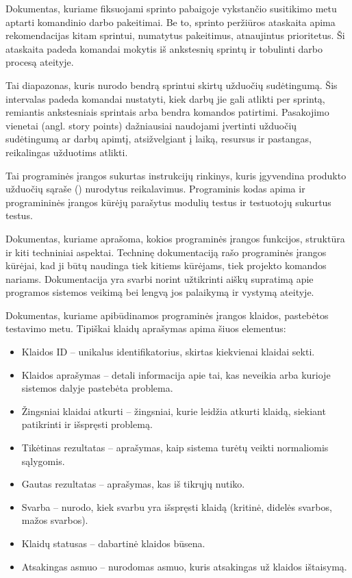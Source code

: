  {
Dokumentas, kuriame fiksuojami sprinto pabaigoje vykstančio susitikimo metu aptarti komandinio darbo pakeitimai. Be to, sprinto peržiūros ataskaita apima rekomendacijas kitam sprintui, numatytus pakeitimus, atnaujintus prioritetus. Ši ataskaita padeda komandai mokytis iš ankstesnių sprintų ir tobulinti darbo procesą ateityje.
}

 {
 Tai diapazonas, kuris nurodo bendrą sprintui skirtų užduočių sudėtingumą. Šis intervalas padeda komandai nustatyti, kiek darbų jie gali atlikti per sprintą, remiantis ankstesniais sprintais arba bendra komandos patirtimi. Pasakojimo vienetai (angl. story points) dažniausiai naudojami įvertinti užduočių sudėtingumą ar darbų apimtį, atsižvelgiant į laiką, resursus ir pastangas, reikalingas užduotims atlikti.
}

 {
Tai programinės įrangos sukurtas instrukcijų rinkinys, kuris įgyvendina produkto užduočių sąraše () nurodytus reikalavimus. Programinis kodas apima ir  programininės įrangos kūrėjų parašytus modulių testus ir testuotojų sukurtus testus.
}

 {
Dokumentas, kuriame aprašoma, kokios programinės įrangos funkcijos, struktūra ir kiti techniniai aspektai. Techninę dokumentaciją rašo programinės įrangos kūrėjai, kad ji būtų naudinga tiek kitiems kūrėjams, tiek projekto komandos nariams. Dokumentacija yra svarbi norint užtikrinti aiškų supratimą apie programos sistemos veikimą bei lengvą jos palaikymą ir vystymą ateityje.
}

 {
Dokumentas, kuriame apibūdinamos programinės įrangos klaidos, pastebėtos testavimo metu. Tipiškai klaidų aprašymas apima šiuos elementus:

\begin{itemize}
    \item Klaidos ID – unikalus identifikatorius, skirtas kiekvienai klaidai sekti.
    \item Klaidos aprašymas – detali informacija apie tai, kas neveikia arba kurioje sistemos dalyje pastebėta problema.
    \item Žingsniai klaidai atkurti – žingsniai, kurie leidžia atkurti klaidą, siekiant patikrinti ir išspręsti problemą.
    \item Tikėtinas rezultatas – aprašymas, kaip sistema turėtų veikti normaliomis sąlygomis.
    \item Gautas rezultatas – aprašymas, kas iš tikrųjų nutiko.
    \item Svarba – nurodo, kiek svarbu yra išspręsti klaidą (kritinė, didelės svarbos, mažos svarbos).
    \item Klaidų statusas – dabartinė klaidos būsena.
    \item Atsakingas asmuo – nurodomas asmuo, kuris atsakingas už klaidos ištaisymą.
\end{itemize}
}

